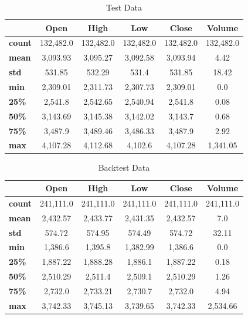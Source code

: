 \begin{table}[H]
    \centering
    \begin{tabular}{L{1.5cm}ccccc}
        \toprule
        & Open & High & Low & Close & Volume
        \\
        \midrule
        \textbf{count} & 132,482.0 & 132,482.0 & 132,482.0 & 132,482.0 & 132,482.0 \\
        \textbf{mean}  & 3,093.93  & 3,095.27  & 3,092.58  & 3,093.94  & 4.42      \\
        \textbf{std}   & 531.85   & 532.29   & 531.4    & 531.85   & 18.42    \\
        \textbf{min}   & 2,309.01  & 2,311.73  & 2,307.73  & 2,309.01  & 0.0       \\
        \textbf{25\%}  & 2,541.8   & 2,542.65  & 2,540.94  & 2,541.8   & 0.08      \\
        \textbf{50\%}  & 3,143.69  & 3,145.38  & 3,142.02  & 3,143.7   & 0.68      \\
        \textbf{75\%}  & 3,487.9   & 3,489.46  & 3,486.33  & 3,487.9   & 2.92      \\
        \textbf{max}   & 4,107.28  & 4,112.68  & 4,102.6   & 4,107.28  & 1,341.05  \\
        \bottomrule
    \end{tabular}
    \caption{Test Data}
    \label{tbl:test-data}
\end{table}

\begin{table}[H]
    \centering
    \begin{tabular}{L{1.5cm}ccccc}
        \toprule
        & Open & High & Low & Close & Volume
        \\
        \midrule
        \textbf{count} & 241,111.0 & 241,111.0 & 241,111.0 & 241,111.0 & 241,111.0 \\
        \textbf{mean}  & 2,432.57  & 2,433.77  & 2,431.35  & 2,432.57  & 7.0       \\
        \textbf{std}   & 574.72   & 574.95   & 574.49   & 574.72   & 32.11    \\
        \textbf{min}   & 1,386.6   & 1,395.8   & 1,382.99  & 1,386.6   & 0.0       \\
        \textbf{25\%}  & 1,887.22  & 1,888.28  & 1,886.1   & 1,887.22  & 0.18      \\
        \textbf{50\%}  & 2,510.29  & 2,511.4   & 2,509.1   & 2,510.29  & 1.26      \\
        \textbf{75\%}  & 2,732.0   & 2,733.21  & 2,730.7   & 2,732.0   & 4.94      \\
        \textbf{max}   & 3,742.33  & 3,745.13  & 3,739.65  & 3,742.33  & 2,534.66  \\
        \bottomrule
    \end{tabular}
    \caption{Backtest Data}
    \label{tbl:backtest-data}
\end{table}


